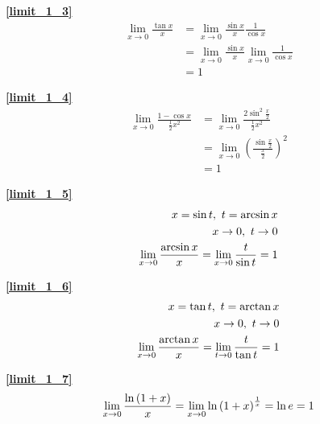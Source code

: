 \textbf{\large \ref{limit_1_3}}
\begin{displaymath}
    \begin{split}
        \lim\limits_{x\to 0}\frac{\tan x}{x}&=\lim\limits_{x\to 0}\frac{\sin x}{x}\frac{1}{\cos x}\\
        &=\lim\limits_{x\to 0}\frac{\sin x}{x}\lim\limits_{x\to 0}\frac{1}{\cos x}\\
        &=1
    \end{split}
\end{displaymath}

\textbf{\large \ref{limit_1_4}}
\begin{displaymath}
    \begin{split}
        \lim\limits_{x\to 0}\frac{1-\cos x}{\frac{1}{2}x^2}&=\lim\limits_{x\to 0}\frac{2\sin^2\frac{x}{2}}{\frac{1}{2}x^2}\\
        &=\lim\limits_{x\to 0}\left(\frac{\sin \frac{x}{2}}{\frac{x}{2}}\right)^2\\
        &=1
    \end{split}
\end{displaymath}

\textbf{\large \ref{limit_1_5}}
\begin{displaymath}
    \centering
    \begin{split}
        x=\sin t,\ t=\arcsin x\\ 
        x\rightarrow 0,\ t\rightarrow 0\\
        \lim\limits_{x\to 0}\frac{\arcsin x}{x}=\lim\limits_{x\to 0}\frac{t}{\sin t}=1
    \end{split}
\end{displaymath}

\textbf{\large \ref{limit_1_6}}
\begin{displaymath}
    \centering
    \begin{split}
        x=\tan t,\ t=\arctan x\\ 
        x\rightarrow 0,\ t\rightarrow 0\\
        \lim\limits_{x\to 0}\frac{\arctan x}{x}=\lim\limits_{t\to 0}\frac{t}{\tan t}=1
    \end{split}
\end{displaymath}

\textbf{\large \ref{limit_1_7}}
\begin{displaymath}
    \centering
    \begin{split}
        \lim\limits_{x\to 0}\frac{\ln \left(1+x\right)}{x}=\lim\limits_{x\to 0}\ln \left(1+x\right)^\frac{1}{x}=\ln e=1
    \end{split}
\end{displaymath}

